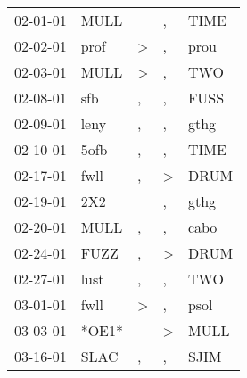 \begin{supertabular}{p{0.07\textwidth}p{0.06\textwidth}p{0.02\textwidth}p{0.02\textwidth}p{0.06\textwidth}}
          02-01-01\textsuperscript{} &           MULL\textsuperscript{} &                  &                , &           TIME\textsuperscript{} \\
          02-02-01\textsuperscript{} &           prof\textsuperscript{} &     \textgreater &                , &           prou\textsuperscript{} \\
          02-03-01\textsuperscript{} &           MULL\textsuperscript{} &     \textgreater &                , &            TWO\textsuperscript{} \\
          02-08-01\textsuperscript{} &            sfb\textsuperscript{} &                , &                , &           FUSS\textsuperscript{} \\
          02-09-01\textsuperscript{} &           leny\textsuperscript{} &                , &                , &           gthg\textsuperscript{} \\
          02-10-01\textsuperscript{} &           5ofb\textsuperscript{} &                , &                , &           TIME\textsuperscript{} \\
          02-17-01\textsuperscript{} &           fwll\textsuperscript{} &                , &     \textgreater &           DRUM\textsuperscript{} \\
          02-19-01\textsuperscript{} &            2X2\textsuperscript{} &                  &                , &           gthg\textsuperscript{} \\
          02-20-01\textsuperscript{} &           MULL\textsuperscript{} &                , &                , &           cabo\textsuperscript{} \\
          02-24-01\textsuperscript{} &           FUZZ\textsuperscript{} &                , &     \textgreater &           DRUM\textsuperscript{} \\
          02-27-01\textsuperscript{} &           lust\textsuperscript{} &                , &                , &            TWO\textsuperscript{} \\
          03-01-01\textsuperscript{} &           fwll\textsuperscript{} &     \textgreater &                , &           psol\textsuperscript{} \\
          03-03-01\textsuperscript{} &                            *OE1* &                  &     \textgreater &           MULL\textsuperscript{} \\
          03-16-01\textsuperscript{} &           SLAC\textsuperscript{} &                , &                , &           SJIM\textsuperscript{} \\

\end{supertabular}
